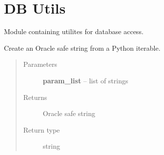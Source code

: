 \documentclass[letterpaper,10pt,english]{sphinxmanual}
\begin{document}
\section{DB Utils}
\label{modules:db-utils}
Module containing utilites for database access.

\begin{fulllineitems}
\label{modules:webb_utils.db_utils.create_db_filter_str}
Create an Oracle safe string from a Python iterable.
\begin{quote}\begin{description}
\item[{Parameters}] \leavevmode
\textbf{param\_list} -- list of strings

\item[{Returns}] \leavevmode
Oracle safe string

\item[{Return type}] \leavevmode
string

\end{description}\end{quote}

\end{fulllineitems}

\end{document}
